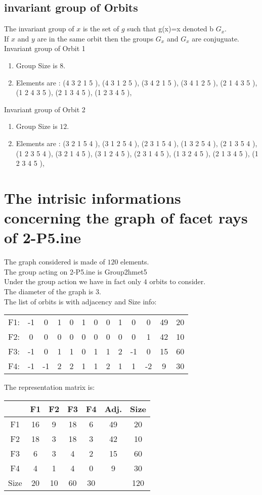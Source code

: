 \documentclass[12pt]{article}
\begin{document}
\subsection{invariant group of Orbits}
\noindent The invariant group of $x$ is the set of $g$ such that g(x)=x denoted b $G_x$.\\
If $x$ and $y$ are in the same orbit then the groups $G_x$ and  $G_x$ are conjuguate.\\
Invariant group of Orbit 1
\begin{enumerate}
\item Group Size is $8$.
\item Elements are : (4 3 2 1 5  ), (4 3 1 2 5  ), (3 4 2 1 5  ), (3 4 1 2 5  ), (2 1 4 3 5  ), (1 2 4 3 5  ), (2 1 3 4 5  ), (1 2 3 4 5  ), 
\end{enumerate}
Invariant group of Orbit 2
\begin{enumerate}
\item Group Size is $12$.
\item Elements are : (3 2 1 5 4  ), (3 1 2 5 4  ), (2 3 1 5 4  ), (1 3 2 5 4  ), (2 1 3 5 4  ), (1 2 3 5 4  ), (3 2 1 4 5  ), (3 1 2 4 5  ), (2 3 1 4 5  ), (1 3 2 4 5  ), (2 1 3 4 5  ), (1 2 3 4 5  ), 
\end{enumerate}
\section{The intrisic informations concerning the graph of facet rays of 2-P5.ine}
The graph considered is made of $120$ elements.\\
The group acting on 2-P5.ine is Group2hmet5\\
Under the group action we have in fact only $4$ orbits to consider.\\
The diameter of the graph is $3$.\\
The list of orbits is with adjacency and Size info:
\begin{center}
\scriptsize
\begin{tabular}{ccccccccccc|c|c}
F1:&-1&0&1&0&1&0&0&1&0&0&49&20\\
F2:&0&0&0&0&0&0&0&0&0&1&42&10\\
F3:&-1&0&1&1&0&1&1&2&-1&0&15&60\\
F4:&-1&-1&2&2&1&1&2&1&1&-2&9&30\\
\end{tabular}
\end{center}
The representation matrix is:
\begin{center}
\scriptsize
\begin{tabular}{|c|cccc|c|c|}
\hline
&F1&F2&F3&F4&Adj.&Size\\
\hline
F1& 16& 9& 18& 6&49&20\\
F2& 18& 3& 18& 3&42&10\\
F3& 6& 3& 4& 2&15&60\\
F4& 4& 1& 4& 0&9&30\\
\hline
Size&20&10&60&30&&120\\
\hline
\end{tabular}
\end{center}
\end{document}

